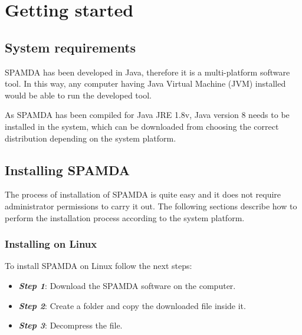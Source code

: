 
\chapter{Getting started}

	\begin{onehalfspace}

		\section{System requirements}

			
			SPAMDA has been developed in Java, therefore it is a multi-platform software tool. In this way, any computer having Java Virtual Machine (JVM) installed would be able to run the developed tool.
			
			As SPAMDA has been compiled for Java JRE 1.8v, Java version 8 needs to be installed in the system, which can be downloaded from \cite{Java} choosing the correct distribution depending on the system platform.
			
		\section{Installing SPAMDA}
		
			The process of installation of SPAMDA is quite easy and it does not require administrator permissions to carry it out. The following sections describe how to perform the installation process according to the system platform.
			
			\subsection{Installing on Linux}
			
				To install SPAMDA on Linux follow the next steps:
			
					\begin{itemize}
						\item \textit{\textbf{Step 1}}: Download the SPAMDA software on the computer.
						\item \textit{\textbf{Step 2}}: Create a folder and copy the downloaded file inside it.
						\item \textit{\textbf{Step 3}}: Decompress the file.
					\end{itemize}
					

\end{onehalfspace}
